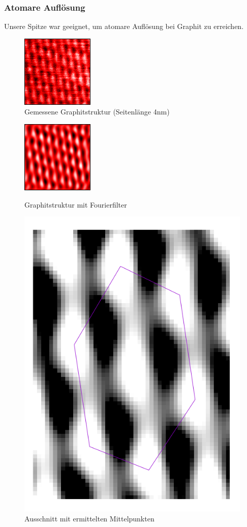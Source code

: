 \subsubsection{Atomare Auflösung}
Unsere Spitze war geeignet, um atomare Auflösung bei Graphit zu erreichen.
\begin{figure}
\centering
\includegraphics[scale=1]{data/graphit/raw.png}
\caption{Gemessene Graphitstruktur (Seitenlänge 4nm)}
\label{fig:raw}
\end{figure}
\begin{figure}
\centering
\includegraphics[scale=1]{data/graphit/2nm_edit2.png}
\label{fig:edit}
\caption{Graphitstruktur mit Fourierfilter}
\end{figure}
\begin{figure}
\centering
\includegraphics[scale=0.35]{data/graphit/graphit.png}
\caption{Ausschnitt mit ermittelten Mittelpunkten}
\label{fig:small}
\end{figure}
